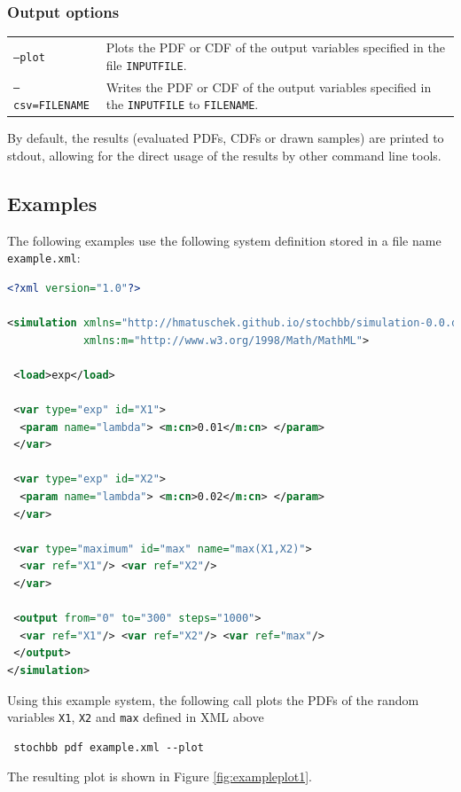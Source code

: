 \documentclass[a4paper, 10pt]{paper}
\newcommand{\code}[1]{\texttt{#1}}
\begin{document}
\subsubsection{Output options}
\begin{tabular}{p{}p{}}
 \code{--plot} & Plots the PDF or CDF of the output variables specified in the file \code{INPUTFILE}. \\
 \code{--csv=FILENAME} & Writes the PDF or CDF of the output variables specified in the \code{INPUTFILE}
  to \code{FILENAME}.
\end{tabular}

By default, the results (evaluated PDFs, CDFs or drawn samples) are printed to stdout, allowing for the direct usage 
of the results by other command line tools.

\subsection{Examples}
The following examples use the following system definition stored in a file name \code{example.xml}:
\begin{lstlisting}[language=XML]
<?xml version="1.0"?>

<simulation xmlns="http://hmatuschek.github.io/stochbb/simulation-0.0.dtd"
            xmlns:m="http://www.w3.org/1998/Math/MathML">

 <load>exp</load>

 <var type="exp" id="X1">
  <param name="lambda"> <m:cn>0.01</m:cn> </param>
 </var>

 <var type="exp" id="X2">
  <param name="lambda"> <m:cn>0.02</m:cn> </param>
 </var>

 <var type="maximum" id="max" name="max(X1,X2)">
  <var ref="X1"/> <var ref="X2"/>
 </var>

 <output from="0" to="300" steps="1000">
  <var ref="X1"/> <var ref="X2"/> <var ref="max"/>
 </output>
</simulation>
\end{lstlisting}

Using this example system, the following call plots the PDFs of the random variables \code{X1}, \code{X2} and \code{max} defined in XML above
\begin{lstlisting}
 stochbb pdf example.xml --plot
\end{lstlisting}

The resulting plot is shown in Figure \ref{fig:exampleplot1}.	
\end{document}

